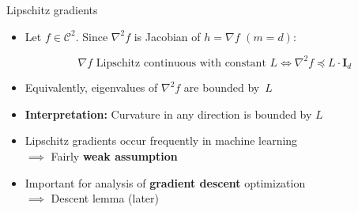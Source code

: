 \documentclass[11pt,compress,t,notes=noshow, xcolor=table]{beamer}
\begin{document}
\begin{vbframe}{Lipschitz gradients}
    \begin{itemize}
        \item Let $f\in\mathcal{C}^2$.
            Since $\nabla^2 f$ is Jacobian of $h = \nabla f$ $(m=d)$:


                \vspace{-\baselineskip}
                \begin{equation*}
                    \text{$\nabla f$ Lipschitz continuous with constant $L$} \Longleftrightarrow \nabla^2 f \preccurlyeq L \cdot \mathbf{I}_d
                \end{equation*}

        \item Equivalently, eigenvalues of $\nabla^2 f$ are bounded by~$L$
        \item \textbf{Interpretation:} Curvature in any direction is bounded by $L$
        \item Lipschitz gradients occur frequently in machine learning \\
            $\implies$ Fairly \textbf{weak assumption}
        \item Important for analysis of \textbf{gradient descent} optimization \\
            $\implies$ Descent lemma (later)
    \end{itemize}
\end{vbframe}

\endlecture
\end{document}

